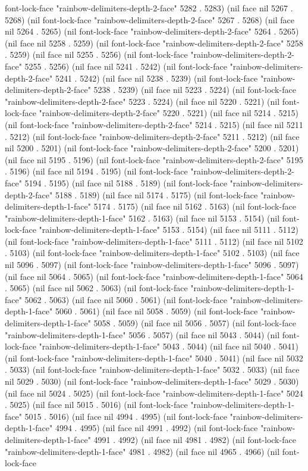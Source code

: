 font-lock-face "rainbow-delimiters-depth-2-face" 5282 . 5283) (nil face nil 5267 . 5268) (nil font-lock-face "rainbow-delimiters-depth-2-face" 5267 . 5268) (nil face nil 5264 . 5265) (nil font-lock-face "rainbow-delimiters-depth-2-face" 5264 . 5265) (nil face nil 5258 . 5259) (nil font-lock-face "rainbow-delimiters-depth-2-face" 5258 . 5259) (nil face nil 5255 . 5256) (nil font-lock-face "rainbow-delimiters-depth-2-face" 5255 . 5256) (nil face nil 5241 . 5242) (nil font-lock-face "rainbow-delimiters-depth-2-face" 5241 . 5242) (nil face nil 5238 . 5239) (nil font-lock-face "rainbow-delimiters-depth-2-face" 5238 . 5239) (nil face nil 5223 . 5224) (nil font-lock-face "rainbow-delimiters-depth-2-face" 5223 . 5224) (nil face nil 5220 . 5221) (nil font-lock-face "rainbow-delimiters-depth-2-face" 5220 . 5221) (nil face nil 5214 . 5215) (nil font-lock-face "rainbow-delimiters-depth-2-face" 5214 . 5215) (nil face nil 5211 . 5212) (nil font-lock-face "rainbow-delimiters-depth-2-face" 5211 . 5212) (nil face nil 5200 . 5201) (nil font-lock-face "rainbow-delimiters-depth-2-face" 5200 . 5201) (nil face nil 5195 . 5196) (nil font-lock-face "rainbow-delimiters-depth-2-face" 5195 . 5196) (nil face nil 5194 . 5195) (nil font-lock-face "rainbow-delimiters-depth-2-face" 5194 . 5195) (nil face nil 5188 . 5189) (nil font-lock-face "rainbow-delimiters-depth-2-face" 5188 . 5189) (nil face nil 5174 . 5175) (nil font-lock-face "rainbow-delimiters-depth-1-face" 5174 . 5175) (nil face nil 5162 . 5163) (nil font-lock-face "rainbow-delimiters-depth-1-face" 5162 . 5163) (nil face nil 5153 . 5154) (nil font-lock-face "rainbow-delimiters-depth-1-face" 5153 . 5154) (nil face nil 5111 . 5112) (nil font-lock-face "rainbow-delimiters-depth-1-face" 5111 . 5112) (nil face nil 5102 . 5103) (nil font-lock-face "rainbow-delimiters-depth-1-face" 5102 . 5103) (nil face nil 5096 . 5097) (nil font-lock-face "rainbow-delimiters-depth-1-face" 5096 . 5097) (nil face nil 5064 . 5065) (nil font-lock-face "rainbow-delimiters-depth-1-face" 5064 . 5065) (nil face nil 5062 . 5063) (nil font-lock-face "rainbow-delimiters-depth-1-face" 5062 . 5063) (nil face nil 5060 . 5061) (nil font-lock-face "rainbow-delimiters-depth-1-face" 5060 . 5061) (nil face nil 5058 . 5059) (nil font-lock-face "rainbow-delimiters-depth-1-face" 5058 . 5059) (nil face nil 5056 . 5057) (nil font-lock-face "rainbow-delimiters-depth-1-face" 5056 . 5057) (nil face nil 5043 . 5044) (nil font-lock-face "rainbow-delimiters-depth-1-face" 5043 . 5044) (nil face nil 5040 . 5041) (nil font-lock-face "rainbow-delimiters-depth-1-face" 5040 . 5041) (nil face nil 5032 . 5033) (nil font-lock-face "rainbow-delimiters-depth-1-face" 5032 . 5033) (nil face nil 5029 . 5030) (nil font-lock-face "rainbow-delimiters-depth-1-face" 5029 . 5030) (nil face nil 5024 . 5025) (nil font-lock-face "rainbow-delimiters-depth-1-face" 5024 . 5025) (nil face nil 5015 . 5016) (nil font-lock-face "rainbow-delimiters-depth-1-face" 5015 . 5016) (nil face nil 4994 . 4995) (nil font-lock-face "rainbow-delimiters-depth-1-face" 4994 . 4995) (nil face nil 4991 . 4992) (nil font-lock-face "rainbow-delimiters-depth-1-face" 4991 . 4992) (nil face nil 4981 . 4982) (nil font-lock-face "rainbow-delimiters-depth-1-face" 4981 . 4982) (nil face nil 4965 . 4966) (nil font-lock-face 